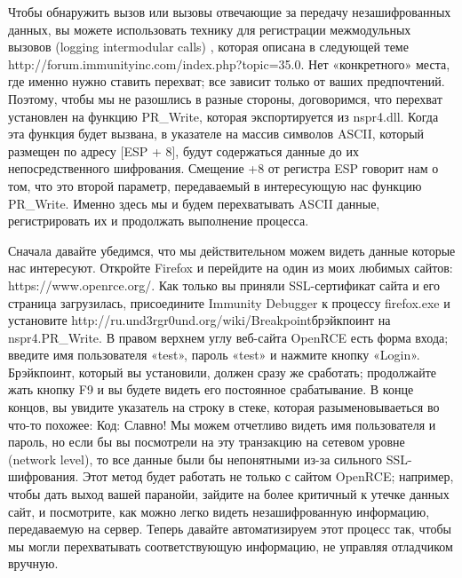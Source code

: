 \documentclass[12pt]{book}
\begin{document}
Чтобы обнаружить вызов или вызовы отвечающие за передачу незашифрованных данных, вы можете использовать технику для регистрации межмодульных вызовов (logging intermodular calls) , которая описана в следующей теме http://forum.immunityinc.com/index.php?topic=35.0. Нет «конкретного» места, где именно нужно ставить перехват; все зависит только от ваших предпочтений. Поэтому, чтобы мы не разошлись в разные стороны, договоримся, что перехват установлен на функцию PR\_Write, которая экспортируется из nspr4.dll. Когда эта функция будет вызвана, в указателе на массив символов ASCII, который размещен по адресу [ESP + 8], будут содержаться данные до их непосредственного шифрования. Смещение +8 от регистра ESP говорит нам о том, что это второй параметр, передаваемый в интересующую нас функцию PR\_Write. Именно здесь мы и будем перехватывать ASCII данные, регистрировать их и продолжать выполнение процесса. 

Сначала давайте убедимся, что мы действительном можем видеть данные которые нас интересуют. Откройте Firefox и перейдите на один из моих любимых сайтов: https://www.openrce.org/. Как только вы приняли SSL-сертификат сайта и его страница загрузилась, присоедините Immunity Debugger к процессу firefox.exe и установите http://ru.und3rgr0und.org/wiki/Breakpointбрэйкпоинт на nspr4.PR\_Write. В правом верхнем углу веб-сайта OpenRCE есть форма входа; введите имя пользователя «test», пароль «test» и нажмите кнопку «Login». Брэйкпоинт, который вы установили, должен сразу же сработать; продолжайте жать кнопку F9 и вы будете видеть его постоянное срабатывание. В конце концов, вы увидите указатель на строку в стеке, которая разыменовываеться во что-то похожее:
Код:
Славно! Мы можем отчетливо видеть имя пользователя и пароль, но если бы вы посмотрели на эту транзакцию на сетевом уровне (network level), то все данные были бы непонятными из-за сильного SSL-шифрования. Этот метод будет работать не только с сайтом OpenRCE; например, чтобы дать выход вашей паранойи, зайдите на более критичный к утечке данных сайт, и посмотрите, как можно легко видеть незашифрованную информацию, передаваемую на сервер. Теперь давайте автоматизируем этот процесс так, чтобы мы могли перехватывать соответствующую информацию, не управляя отладчиком вручную. 
\end{document}
